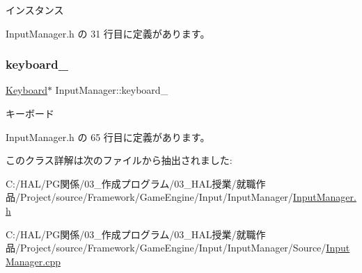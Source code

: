 インスタンス 



 Input\+Manager.\+h の 31 行目に定義があります。

\mbox{\label{class_input_manager_ae9f8c95ddea7d37cb564a7395bcfa65c}} 
\subsubsection{\texorpdfstring{keyboard\+\_\+}{keyboard\_}}
{\footnotesize\ttfamily \mbox{\hyperlink{class_keyboard}{Keyboard}}$\ast$ Input\+Manager\+::keyboard\+\_\+\hspace{0.3cm}{\ttfamily [private]}}



キーボード 



 Input\+Manager.\+h の 65 行目に定義があります。



このクラス詳解は次のファイルから抽出されました\+:\begin{DoxyCompactItemize}
\item 
C\+:/\+H\+A\+L/\+P\+G関係/03\+\_\+作成プログラム/03\+\_\+\+H\+A\+L授業/就職作品/\+Project/source/\+Framework/\+Game\+Engine/\+Input/\+Input\+Manager/\mbox{\hyperlink{_input_manager_8h}{Input\+Manager.\+h}}\item 
C\+:/\+H\+A\+L/\+P\+G関係/03\+\_\+作成プログラム/03\+\_\+\+H\+A\+L授業/就職作品/\+Project/source/\+Framework/\+Game\+Engine/\+Input/\+Input\+Manager/\+Source/\mbox{\hyperlink{_input_manager_8cpp}{Input\+Manager.\+cpp}}\end{DoxyCompactItemize}
